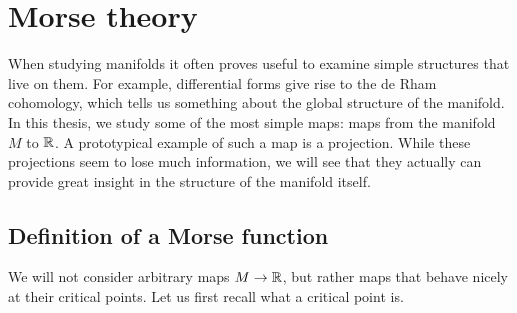 \chapter{Morse theory}
\label{chap:morse-theory}


When studying manifolds it often proves useful to examine simple structures that live on them. For example, differential forms give rise to the de Rham cohomology, which tells us something about the global structure of the manifold. In this thesis, we study some of the most simple maps: maps from the manifold $M$ to $\mathbb{R}$. A prototypical example of such a map is a projection.
While these projections seem to lose much information, we will see that they actually can provide great insight in the structure of the manifold itself.

\section{Definition of a Morse function}

We will not consider arbitrary maps $M \to \mathbb{R}$, but rather maps that behave nicely at their critical points. Let us first recall what a critical point is.

